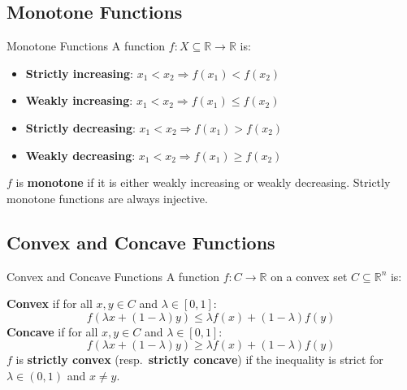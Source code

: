 \documentclass[12pt, a4paper]{article}
\theoremstyle{definition}
\newcommand{\R}{\mathbb{R}}
\begin{document}
\subsection{Monotone Functions}

\begin{defbox}{Monotone Functions}
A function $f: X \subseteq \R \to \R$ is:
\begin{itemize}
  \item \textbf{Strictly increasing}: $x_1 < x_2 \Rightarrow f(x_1) < f(x_2)$
  \item \textbf{Weakly increasing}: $x_1 < x_2 \Rightarrow f(x_1) \leq f(x_2)$
  \item \textbf{Strictly decreasing}: $x_1 < x_2 \Rightarrow f(x_1) > f(x_2)$
  \item \textbf{Weakly decreasing}: $x_1 < x_2 \Rightarrow f(x_1) \geq f(x_2)$
\end{itemize}
$f$ is \textbf{monotone} if it is either weakly increasing or weakly decreasing. Strictly monotone functions are always injective.
\end{defbox}

\subsection{Convex and Concave Functions}

\begin{defbox}{Convex and Concave Functions}
A function $f: C \to \R$ on a convex set $C \subseteq \R^n$ is:

\textbf{Convex} if for all $x, y \in C$ and $\lambda \in [0,1]$:
\[
  f(\lambda x + (1-\lambda)y) \leq \lambda f(x) + (1-\lambda)f(y)
\]
\textbf{Concave} if for all $x, y \in C$ and $\lambda \in [0,1]$:
\[
  f(\lambda x + (1-\lambda)y) \geq \lambda f(x) + (1-\lambda)f(y)
\]
$f$ is \textbf{strictly convex} (resp.\ \textbf{strictly concave}) if the inequality is strict for $\lambda \in (0,1)$ and $x \neq y$.
\end{defbox}
\end{document}
